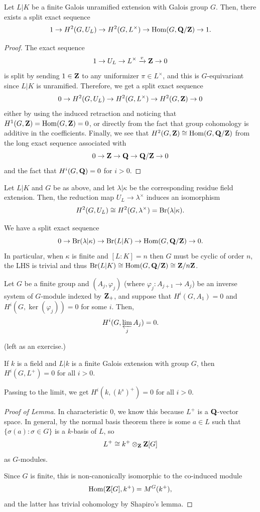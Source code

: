 \documentclass{article}
\begin{document}
\begin{lem}
	Let $L|K$ be a finite Galois unramified extension with Galois group $G$. Then, there exists a split exact sequence
	\[
		1 \to H^2(G,U_L) \to H^2(G,L^\times) \to \operatorname{Hom}(G,\mathbf{Q}/\mathbf{Z}) \to 1.
	\]	
\end{lem}
\begin{proof}
		The exact sequence
		\[
			1 \to U_L \to L^\times \xrightarrow{v} \mathbf{Z} \to 0	
		\]
		is split by sending $1\in \mathbf{Z}$ to any uniformizer $\pi\in L^\times$, and this is $G$-equivariant since $L|K$ is unramified. Therefore, we get a split exact sequence
		\[
			0 \to H^2(G,U_L) \to H^2(G,L^\times) \to H^2(G,\mathbf{Z}) \to 0
		\]
		either by using the induced retraction and noticing that $H^1(G,\mathbf{Z})=\operatorname{Hom}(G,\mathbf{Z})=0$, or directly from the fact that group cohomology is additive in the coefficients. Finally, we see that $H^2(G,\mathbf{Z}) \cong \operatorname{Hom}(G,\mathbf{Q}/\mathbf{Z})$ from the long exact sequence associated with $$0\to \mathbf{Z}\to \mathbf{Q}\to \mathbf{Q}/\mathbf{Z}\to 0$$ and the fact that $H^i(G,\mathbf{Q})=0$ for $i>0$.
\end{proof}

\begin{prop}\label{prop:brauerresidue}
		Let $L|K$ and $G$ be as above, and let $\lambda|\kappa$ be the corresponding residue field extension. Then, the reduction map $U_L\to \lambda^\times$ induces an isomorphism
		\[
			H^2(G,U_L) \cong H^2(G,\lambda^\times)=\text{Br}(\lambda|\kappa).
		\]
\end{prop}
\begin{cor}
		We have a split exact sequence
		\[
			0\to\text{Br}(\lambda|\kappa)\to\text{Br}(L|K)\to\operatorname{Hom}(G,\mathbf{Q} / \mathbf{Z})\to 0.
		\]
		In particular, when $\kappa$ is finite and $[L:K]=n$ then $G$ must be cyclic of order $n$, the LHS is trivial and thus $\text{Br}(L|K)\cong\operatorname{Hom}(G,\mathbf{Q}/\mathbf{Z})\cong \mathbf{Z}/n\mathbf{Z}$.
\end{cor}
\begin{lem}\label{lem:invlimcohom}
				Let $G$ be a finite group and $(A_j,\varphi_j)$ (where $\varphi_j: A_{j+1} \to A_j$) be an inverse system of $G$-module indexed by $\mathbf{Z}_+$, and suppose that $H^i(G,A_1)=0$ and $H^i(G,\ker(\varphi_j))=0$ for some $i$. Then,$$H^i(G,\varprojlim_j A_j)=0.$$
		\end{lem}\noindent(left as an exercise.)
		\begin{lem}
				If $k$ is a field and $L|k$ is a finite Galois extension with group $G$, then $H^i(G,L^+)=0$ for all $i>0$.
		\end{lem}
		\begin{cor}
				Passing to the limit, we get $H^i(k,(k^s)^+)=0$ for all $i>0$.
		\end{cor}
		\begin{proof}[Proof of Lemma]
				In characteristic $0$, we know this because $L^+$ is a $\mathbf{Q}$-vector space. In general, by the normal basis theorem there is some $a\in L$ such that $\{\sigma(a):\sigma\in G\}$ is a $k$-basis of $L$, so $$L^+\cong k^+ \otimes_{\mathbf{Z}} \mathbf{Z}[G]$$ as $G$-modules.
				
				Since $G$ is finite, this is non-canonically isomorphic to the co-induced module $$\operatorname{Hom}(\mathbf{Z}[G],k^+)=M^G(k^+),$$ and the latter has trivial cohomology by Shapiro's lemma.
		\end{proof}
		
\end{document}

